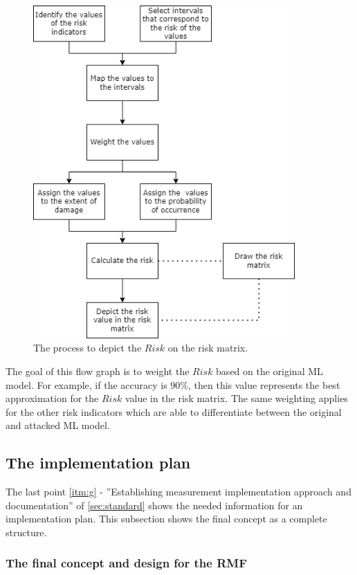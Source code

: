 \begin{figure}[h!]
  \centering
  \includegraphics[width=10cm]{pictures/flow_graph.png}
  \caption{The process to depict the $Risk$ on the risk matrix.}
  \label{fig:flow_graph}
\end{figure}

The goal of this flow graph is to weight the $Risk$ based on the original ML model. For example, if the accuracy is $90\%$, then this value represents the best approximation for the $Risk$ value in the risk matrix. The same weighting applies for the other risk indicators which are able to differentiate between the original and attacked ML model.

\newpage

\subsection{The implementation plan}
\label{sec:final_design}

The last point \ref{itm:g} - ''Establishing measurement implementation approach and documentation'' of \ref{sec:standard} shows the needed information for an implementation plan. This subsection shows the final concept as a complete structure.

\subsubsection*{The final concept and design for the RMF}

